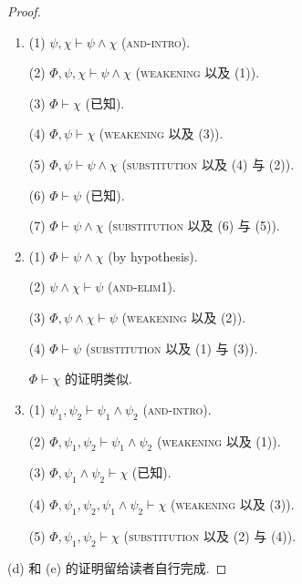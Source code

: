 \begin{proof}
    \begin{enumerate}[itemindent=0ex, itemsep=0pt, label=\upshape{(\alph*)}]
        \item (1) $\psi,\chi\vdash\psi\wedge\chi$ (\textsc{and-intro}). 
        
        (2) $\Phi,\psi,\chi\vdash\psi\wedge\chi$ (\textsc{weakening} 以及 (1)). 

        (3) $\Phi\vdash\chi$ (已知). 
        
        (4) $\Phi,\psi\vdash\chi$ (\textsc{weakening} 以及 (3)). 
        
        (5) $\Phi,\psi\vdash\psi\wedge\chi$ (\textsc{substitution} 以及 (4) 与 (2)). 
        
        (6) $\Phi\vdash\psi$ (已知). 
        
        (7) $\Phi\vdash\psi\wedge\chi$ (\textsc{substitution} 以及 (6) 与 (5)).
        \item (1) $\Phi\vdash\psi\wedge\chi$ (by hypothesis). 
        
        (2) $\psi\wedge\chi\vdash\psi$ (\textsc{and-elim1}). 
        
        (3) $\Phi, \psi\wedge\chi\vdash\psi$ (\textsc{weakening} 以及 (2)). 
        
        (4) $\Phi\vdash\psi$ (\textsc{substitution} 以及 (1) 与 (3)). 
        
        $\Phi\vdash\chi$ 的证明类似.
        \item (1) $\psi_1,\psi_2\vdash\psi_1\wedge\psi_2$ (\textsc{and-intro}). 
        
        (2) $\Phi,\psi_1,\psi_2\vdash\psi_1\wedge\psi_2$ (\textsc{weakening} 以及 (1)). 
        
        (3) $\Phi, \psi_1\wedge\psi_2\vdash\chi$ (已知). 
        
        (4) $\Phi,\psi_1,\psi_2,\psi_1\wedge\psi_2\vdash\chi$ (\textsc{weakening} 以及 (3)). 
        
        (5) $\Phi,\psi_1,\psi_2\vdash\chi$ (\textsc{substitution} 以及 (2) 与 (4)).
    \end{enumerate}
    
    \mbox{}

    (d) 和 (e) 的证明留给读者自行完成. 
\end{proof}
